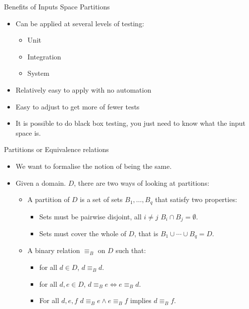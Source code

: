 \documentclass{beamer}
\begin{document}
\begin{frame}{Benefits of Inputs Space Partitions}
  \begin{itemize}
  \item Can be applied at several levels of testing:
    \begin{itemize}
    \item Unit
    \item Integration
    \item System
    \end{itemize}
  \item Relatively easy to apply with no automation
  \item Easy to adjust to get more of fewer tests
  \item It is possible to do black box testing, you just need to know
    what the input space is.
  \end{itemize}
    
\end{frame}
\begin{frame}{Partitions or Equivalence relations} 
  \begin{itemize}
  \item We want to formalise the notion of being the same.
  \item Given a domain. $D$, there are two ways of looking at partitions:
    \begin{itemize}
    \item A partition of $D$ is a set of sets $B_1,\ldots,B_q$  that
      satisfy two properties:
      \begin{itemize}
      \item  Sets must be pairwise disjoint, all $i\neq j$ $B_i \cap
        B_j = \emptyset$.
      \item Sets must cover the whole of $D$, that is $B_1\cup \cdots
        \cup B_q = D$.
      \end{itemize}
    \item A binary relation $\equiv_B$  on $D$ such that:
      \begin{itemize}
      \item for all $d \in D$, $d \equiv_B d$.
      \item for all $d,e \in D$, $d \equiv_B e \Leftrightarrow e
        \equiv_B d$.
      \item For all $d,e,f$ $d \equiv_B e \land e \equiv_B f$ implies
        $d \equiv_B f$.
      \end{itemize}
    \end{itemize}
  \end{itemize}
 \end{frame}
\end{document}
